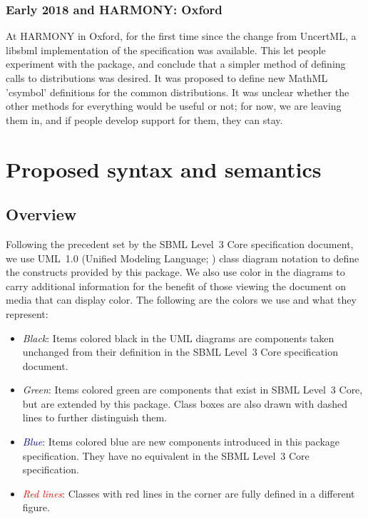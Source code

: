 \documentclass[draftspec]{sbmlpkgspec}
\begin{document}
\subsubsection{Early 2018 and HARMONY: Oxford}

At HARMONY in Oxford, for the first time since the change from UncertML, a libsbml implementation of the specification was available.  This let people experiment with the package, and conclude that a simpler method of defining calls to distributions was desired.  It was proposed to define new MathML 'csymbol' definitions for the common distributions.  It was unclear whether the other methods for everything would be useful or not; for now, we are leaving them in, and if people develop support for them, they can stay.


\section{Proposed syntax and semantics}

\subsection{Overview}

Following the precedent set by the SBML Level~3 Core specification
document, we use UML~1.0 (Unified Modeling Language;
\citealt{eriksson:1998,oestereich:1999}) class diagram notation to
define the constructs provided by this package.  We also use color in
the diagrams to carry additional information for the benefit of those
viewing the document on media that can display color.  The following are
the colors we use and what they represent:

\begin{itemize}

\item[\raisebox{2.75pt}{\colorbox{black}{\rule{0.8pt}{0.8pt}}}]
  \emph{Black}: Items colored black in the UML diagrams are components
  taken unchanged from their definition in the SBML Level~3 Core
  specification document.

\item[\raisebox{2.75pt}{\colorbox{mediumgreen}{\rule{0.8pt}{0.8pt}}}]
  \emph{\textcolor{mediumgreen}{Green}}: Items colored green are
  components that exist in SBML Level~3 Core, but are extended by this
  package.  Class boxes are also drawn with dashed lines to further
  distinguish them.

\item[\raisebox{2.75pt}{\colorbox{darkblue}{\rule{0.8pt}{0.8pt}}}]
  \emph{\textcolor{darkblue}{Blue}}: Items colored blue are new
  components introduced in this package specification.  They have no
  equivalent in the SBML Level~3 Core specification.

\item[\raisebox{2.75pt}{\colorbox{red}{\rule{0.8pt}{0.8pt}}}]
  \emph{\textcolor{red}{Red lines}}: Classes with red lines in the corner are fully defined in a different figure.

\end{itemize}
\end{document}
